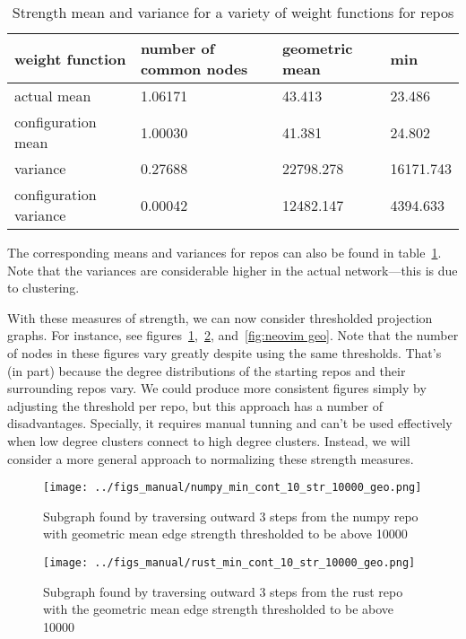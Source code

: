 \documentclass{pset}
\begin{document}
\begin{table}[ht]
\begin{tabular}{l|lll}
 weight function        & number of common nodes & geometric mean & min \\\hline
 actual mean            & 1.06171                & 43.413         & 23.486 \\\hline
 configuration mean     & 1.00030                & 41.381         & 24.802 \\\hline
 variance               & 0.27688                & 22798.278      & 16171.743 \\\hline
 configuration variance & 0.00042                & 12482.147      & 4394.633 \\\hline
\end{tabular}
    \caption{Strength mean and variance for a variety of weight functions for
    repos}\label{tab:mean var}
\end{table}

The corresponding means and variances for repos can also be found in
table~\ref{tab:mean var}.
Note that the variances are considerable higher in the actual network---this 
is due to clustering.

With these measures of strength, we can now consider thresholded projection
graphs. For instance, see figures~\ref{fig:numpy geo},~\ref{fig:rust geo}, 
and~\ref{fig:neovim geo}.
Note that the number of nodes in these figures vary greatly despite using
the same thresholds. That's (in part) because the degree distributions
of the starting repos and their surrounding repos vary.
We could produce more consistent figures simply by adjusting the threshold per
repo, but this approach has a number of disadvantages. Specially,
it requires manual tunning and can't be used effectively when low degree
clusters connect to high degree clusters. Instead, we will
consider a more general approach to normalizing these strength measures.

\begin{figure}[ht]
\centering
\texttt{[image: ../figs\_manual/numpy\_min\_cont\_10\_str\_10000\_geo.png]}
\caption{Subgraph found by traversing outward 3 steps from the numpy repo with
geometric mean edge strength thresholded to be above 
10000}\label{fig:numpy geo}
\end{figure}

\begin{figure}[ht]
\centering
\texttt{[image: ../figs\_manual/rust\_min\_cont\_10\_str\_10000\_geo.png]}
\caption{Subgraph found by traversing outward 3 steps from the rust repo with
    the geometric mean edge strength thresholded to be above 10000}\label{fig:rust geo}
\end{figure}
\end{document}
